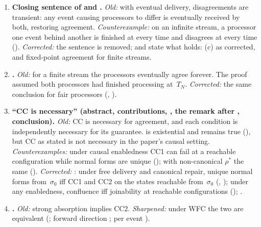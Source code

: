 \documentclass[11pt,a4paper]{article}
\theoremstyle{plain}
\theoremstyle{definition}
\theoremstyle{remark}
\renewcommand{\_}{\textunderscore\allowbreak}
\begin{document}
\begin{enumerate}[leftmargin=*,label=\textbf{E\arabic*.},ref=E\arabic*]
\item \textbf{Closing sentence of  and
  .}
  \emph{Old:} with eventual delivery, disagreements are transient: any event
  causing processors to differ is eventually received by both, restoring
  agreement.
  \emph{Counterexample:} on an infinite stream, a processor one event behind
  another is finished at every time and disagrees at every time
  ().
  \emph{Corrected:} the sentence is removed;  and
   state what holds: (c) as corrected, and
  fixed-point agreement for finite streams.

\item \textbf{.}
  \emph{Old:} for a finite stream the processors eventually agree forever.
  The proof assumed both processors had finished processing at~$T_N$.
  \emph{Corrected:} the same conclusion for fair processors
  (, ).

\item \textbf{``CC is necessary'' (abstract, contributions,
  , the remark after ,
  conclusion).}
  \emph{Old:} CC is necessary for agreement, and each condition is
  independently necessary for its guarantee.   is
  existential and remains true (), but CC as stated is
  not necessary in the paper's causal setting.
  \emph{Counterexamples:} under causal enabledness CC1 can fail at a
  reachable configuration while normal forms are unique
  (); with non-canonical $\rho^*$ the same
  ().
  \emph{Corrected:} : under free delivery and canonical
  repair, unique normal forms from~$\sigma_0$ iff CC1 and CC2 on the states
  reachable from~$\sigma_0$ (, );
  under any enabledness, confluence iff joinability at reachable
  configurations (); .

\item \textbf{.}
  \emph{Old:} strong absorption implies CC2.
  \emph{Sharpened:} under WFC the two are equivalent
  (; forward direction
  ; per event
  ).


\end{enumerate}
\end{document}
